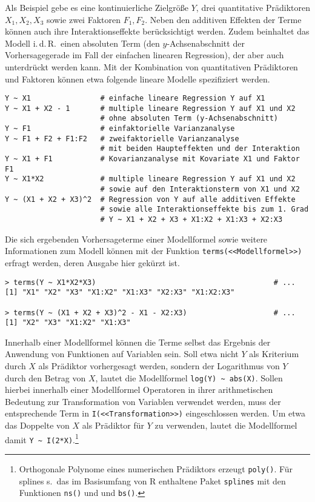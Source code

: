 Als Beispiel gebe es eine kontinuierliche Zielgröße $Y$, drei quantitative Prädiktoren $X_{1}, X_{2}, X_{3}$ sowie zwei Faktoren $F_{1}, F_{2}$. Neben den additiven Effekten der Terme können auch ihre Interaktionseffekte berücksichtigt werden. Zudem beinhaltet das Modell i.\,d.\,R.\ einen absoluten Term (den $y$-Achsenabschnitt der Vorhersagegerade im Fall der einfachen linearen Regression), der aber auch unterdrückt werden kann. Mit der Kombination von quantitativen Prädiktoren und Faktoren können etwa folgende lineare Modelle spezifiziert werden.
\begin{lstlisting}
Y ~ X1                # einfache lineare Regression Y auf X1
Y ~ X1 + X2 - 1       # multiple lineare Regression Y auf X1 und X2
                      # ohne absoluten Term (y-Achsenabschnitt)
Y ~ F1                # einfaktorielle Varianzanalyse
Y ~ F1 + F2 + F1:F2   # zweifaktorielle Varianzanalyse
                      # mit beiden Haupteffekten und der Interaktion
Y ~ X1 + F1           # Kovarianzanalyse mit Kovariate X1 und Faktor F1
Y ~ X1*X2             # multiple lineare Regression Y auf X1 und X2
                      # sowie auf den Interaktionsterm von X1 und X2
Y ~ (X1 + X2 + X3)^2  # Regression von Y auf alle additiven Effekte
                      # sowie alle Interaktionseffekte bis zum 1. Grad
                      # Y ~ X1 + X2 + X3 + X1:X2 + X1:X3 + X2:X3
\end{lstlisting}

Die sich ergebenden Vorhersageterme einer Modellformel sowie weitere Informationen zum Modell können mit der Funktion \lstinline!terms(<<Modellformel>>)! erfragt werden, deren Ausgabe hier gekürzt ist.
\begin{lstlisting}
> terms(Y ~ X1*X2*X3)                                         # ...
[1] "X1" "X2" "X3" "X1:X2" "X1:X3" "X2:X3" "X1:X2:X3"

> terms(Y ~ (X1 + X2 + X3)^2 - X1 - X2:X3)                    # ...
[1] "X2" "X3" "X1:X2" "X1:X3"
\end{lstlisting}

Innerhalb einer Modellformel können die Terme selbst das Ergebnis der Anwendung von Funktionen auf Variablen sein. Soll etwa nicht $Y$ als Kriterium durch $X$ als Prädiktor vorhergesagt werden, sondern der Logarithmus von $Y$ durch den Betrag von $X$, lautet die Modellformel \lstinline!log(Y) ~ abs(X)!. Sollen hierbei innerhalb einer Modellformel Operatoren in ihrer arithmetischen Bedeutung zur Transformation von Variablen verwendet werden, muss der entsprechende Term in \lstinline!I(<<Transformation>>)! eingeschlossen werden. Um etwa das Doppelte von $X$ als Prädiktor für $Y$ zu verwenden, lautet die Modellformel damit \lstinline!Y ~ I(2*X)!.\footnote{Orthogonale Polynome eines numerischen Prädiktors erzeugt \lstinline!poly()!. Für splines s.\ das im Basisumfang von R enthaltene Paket \lstinline!splines! mit den Funktionen \lstinline!ns()! und und \lstinline!bs()!.}

